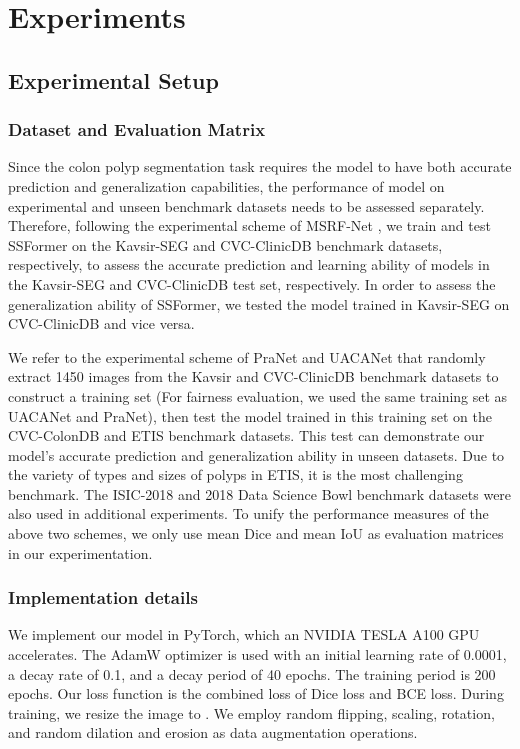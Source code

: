 \documentclass[runningheads]{llncs}
\begin{document}
\section{Experiments}
\subsection{Experimental Setup}\label{Setup}
\subsubsection{Dataset and Evaluation Matrix}
Since the colon polyp segmentation task requires the model to have both accurate prediction and generalization capabilities, the performance of model on experimental and unseen benchmark datasets needs to be assessed separately. Therefore, following the experimental scheme of MSRF-Net \cite{srivastava2021msrf}, we train and test  SSFormer on the Kavsir-SEG \cite{jha2020kvasir} and CVC-ClinicDB \cite{bernal2015wm} benchmark datasets, respectively, to assess the accurate prediction and learning ability of models in the Kavsir-SEG and CVC-ClinicDB test set, respectively. In order to assess the generalization ability of SSFormer, we tested the model trained in Kavsir-SEG on CVC-ClinicDB and vice versa. 

We refer to the experimental scheme of PraNet \cite{pranet} and UACANet \cite{UACAnet} that randomly extract 1450 images from the Kavsir and CVC-ClinicDB benchmark datasets to construct a training set (For fairness evaluation, we used the same training set as UACANet and PraNet), then test the model trained in this training set on the CVC-ColonDB \cite{bernal2012towards} and ETIS \cite{silva2014toward} benchmark datasets. This test can demonstrate our model's accurate prediction and generalization ability in unseen datasets. Due to the variety of types and sizes of polyps in ETIS, it is the most challenging benchmark. The ISIC-2018 \cite{codella2018skin,tschandl2018ham10000} and 2018 Data Science Bowl \cite{caicedo2019nucleus} benchmark datasets were also used in additional experiments. To unify the performance measures of the above two schemes, we only use mean Dice and mean IoU as evaluation matrices in our experimentation.

\subsubsection{Implementation details}
We implement our model in PyTorch, which an NVIDIA TESLA A100 GPU accelerates. The AdamW optimizer is used with an initial learning rate of 0.0001, a decay rate of 0.1, and a decay period of 40 epochs. The training period is 200 epochs. Our loss function is the combined loss of Dice loss and BCE loss. During training, we resize the image to . We employ random flipping, scaling, rotation, and random dilation and erosion as data augmentation operations. 
\end{document}

